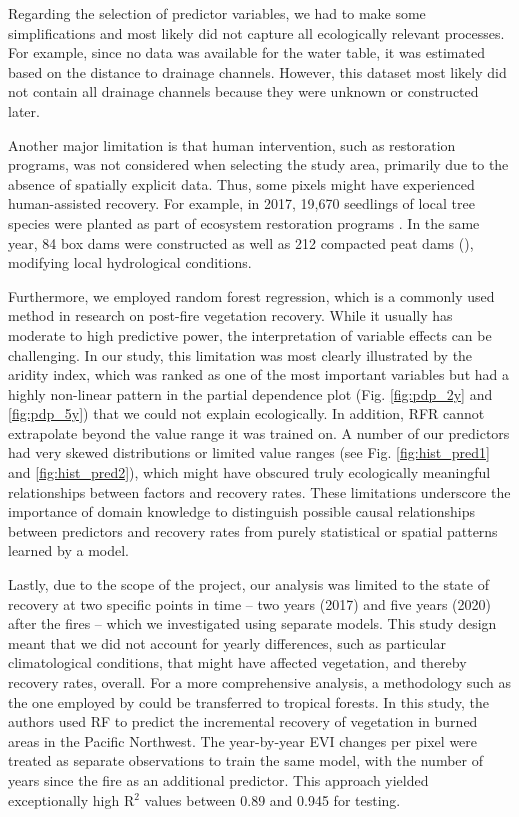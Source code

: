 \documentclass[
  fontsize=12pt,
  paper=a4,
  parskip=half,
  headings=big,
  DIV=12
]{scrreprt}
\begin{document}
Regarding the selection of predictor variables, we had to make some simplifications and most likely did not capture all ecologically relevant processes. For example, since no data was available for the water table, it was estimated based on the distance to drainage channels. However, this dataset most likely did not contain all drainage channels because they were unknown or constructed later.

Another major limitation is that human intervention, such as restoration programs, was not considered when selecting the study area, primarily due to the absence of spatially explicit data. Thus, some pixels might have experienced human-assisted recovery. For example, in 2017, 19,670 seedlings of local tree species were planted as part of ecosystem restoration programs {\cite{lestari_understanding_2022}}. In the same year, 84 box dams were constructed as well as 212 compacted peat dams (\cite{giesen_roles_2023}), modifying local hydrological conditions.

Furthermore, we employed random forest regression, which is a commonly used method in research on post-fire vegetation recovery. While it usually has moderate to high predictive power, the interpretation of variable effects can be challenging. In our study, this limitation was most clearly illustrated by the aridity index, which was ranked as one of the most important variables but had a highly non-linear pattern in the partial dependence plot (Fig. \ref{fig:pdp_2y} and \ref{fig:pdp_5y}) that we could not explain ecologically. In addition, RFR cannot extrapolate beyond the value range it was trained on. A number of our predictors had very skewed distributions or limited value ranges (see Fig. \ref{fig:hist_pred1} and \ref{fig:hist_pred2}), which might have obscured truly ecologically meaningful relationships between factors and recovery rates. These limitations underscore the importance of domain knowledge to distinguish possible causal relationships between predictors and recovery rates from purely statistical or spatial patterns learned by a model.

Lastly, due to the scope of the project, our analysis was limited to the state of recovery at two specific points in time -- two years (2017) and five years (2020) after the fires -- which we investigated using separate models. This study design meant that we did not account for yearly differences, such as particular climatological conditions, that might have affected vegetation, and thereby recovery rates, overall. For a more comprehensive analysis, a methodology such as the one employed by \textcite{zahura_impact_2024} could be transferred to tropical forests. In this study, the authors used RF to predict the incremental recovery of vegetation in burned areas in the Pacific Northwest. The year-by-year EVI changes per pixel were treated as separate observations to train the same model, with the number of years since the fire as an additional predictor. This approach yielded exceptionally high R$^2$ values between 0.89 and 0.945 for testing.
\end{document}
